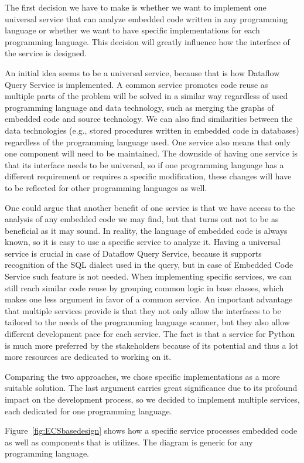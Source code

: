 The first decision we have to make is whether we want to implement one universal service that can analyze embedded code written in any programming language or whether we want to have specific implementations for each programming language. This decision will greatly influence how the interface of the service is designed.
\par
An initial idea seems to be a universal service, because that is how Dataflow Query Service is implemented. A common service promotes code reuse as multiple parts of the problem will be solved in a similar way regardless of used programming language and data technology, such as merging the graphs of embedded code and source technology. We can also find similarities between the data technologies (e.g., stored procedures written in embedded code in databases) regardless of the programming language used. One service also means that only one component will need to be maintained. The downside of having one service is that its interface needs to be universal, so if one programming language has a different requirement or requires a specific modification, these changes will have to be reflected for other programming languages as well.
\par
One could argue that another benefit of one service is that we have access to the analysis of any embedded code we may find, but that turns out not to be as beneficial as it may sound. In reality, the language of embedded code is always known, so it is easy to use a specific service to analyze it. Having a universal service is crucial in case of Dataflow Query Service, because it supports recognition of the SQL dialect used in the query, but in case of Embedded Code Service such feature is not needed. When implementing specific services, we can still reach similar code reuse by grouping common logic in base classes, which makes one less argument in favor of a common service. An important advantage that multiple services provide is that they not only allow the interfaces to be tailored to the needs of the programming language scanner, but they also allow different development pace for each service. The fact is that a service for Python is much more preferred by the stakeholders because of its potential and thus a lot more resources are dedicated to working on it.
\par
Comparing the two approaches, we chose specific implementations as a more suitable solution.
The last argument carries great significance due to its profound impact on the development process, so we decided to implement multiple services, each dedicated for one programming language.  
\par
Figure~\ref{fig:ECSbasedesign} shows how a specific service processes embedded code as well as components that is utilizes. The diagram is generic for any programming language.

